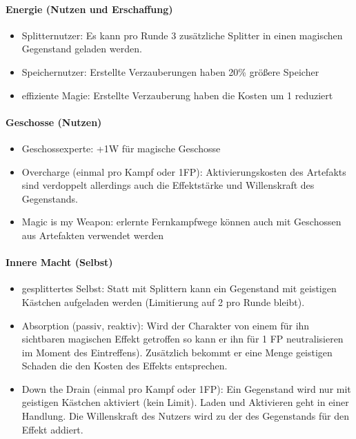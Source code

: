 \documentclass{article}
\begin{document}
\paragraph{Energie (Nutzen und Erschaffung)}

\begin{itemize}
\item Splitternutzer: Es kann pro Runde 3 zusätzliche Splitter in einen magischen Gegenstand geladen werden.
\item Speichernutzer: Erstellte Verzauberungen haben 20\% größere Speicher
\item effiziente Magie: Erstellte Verzauberung haben die Kosten um 1 reduziert
\end{itemize}

\paragraph{Geschosse (Nutzen)}

\begin{itemize}
\item Geschossexperte: +1W für magische Geschosse
\item Overcharge (einmal pro Kampf oder 1FP): Aktivierungskosten des Artefakts sind verdoppelt allerdings auch die Effektstärke und Willenskraft des Gegenstands.
\item Magic is my Weapon: erlernte Fernkampfwege können auch mit Geschossen aus Artefakten verwendet werden
\end{itemize}

\paragraph{Innere Macht (Selbst)}

\begin{itemize}
\item gesplittertes Selbst: Statt mit Splittern kann ein Gegenstand mit geistigen Kästchen aufgeladen werden (Limitierung auf 2 pro Runde bleibt).
\item Absorption (passiv, reaktiv): Wird der Charakter von einem für ihn sichtbaren magischen Effekt getroffen so kann er ihn für 1 FP neutralisieren im Moment des Eintreffens). Zusätzlich bekommt er eine Menge geistigen Schaden die den Kosten des Effekts entsprechen.
\item Down the Drain (einmal pro Kampf oder 1FP): Ein Gegenstand wird nur mit geistigen Kästchen aktiviert (kein Limit). Laden und Aktivieren geht in einer Handlung. Die Willenskraft des Nutzers wird zu der des Gegenstands für den Effekt addiert.
\end{itemize}
\end{document}

